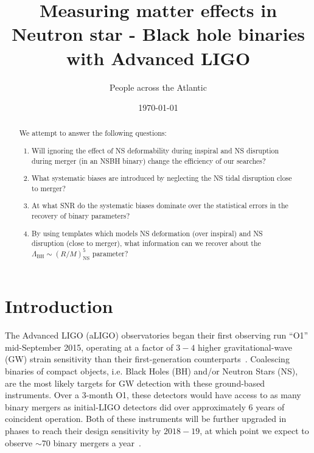 \documentclass[aps,prd,amsmath,floats,floatfix, twocolumn,
superscriptaddress,nofootinbib,showpacs]{revtex4-1}
\begin{document}
\title{
Measuring matter effects in Neutron star - Black hole binaries with Advanced LIGO
}

\author{People across the Atlantic}

\date{\today}

\begin{abstract}
We attempt to answer the following questions: 
\begin{enumerate}
 \item Will ignoring the effect of NS deformability during inspiral and NS 
 disruption during merger (in an NSBH binary) change the efficiency of our 
 searches?
 \item What systematic biases are introduced by neglecting the NS tidal
 disruption close to merger? 
 \item At what SNR do the systematic biases dominate over the statistical 
 errors in the recovery of binary parameters?
 \item By using templates which models NS deformation (over inspiral) and 
 NS disruption (close to merger), what information can we recover about
 the $\Lambda_\mathrm{BH}\sim (R/M)^5_\mathrm{NS}$ parameter?
\end{enumerate}
\end{abstract}

\pacs{}

\maketitle

\section{Introduction}

The Advanced LIGO (aLIGO) observatories began their first observing run ``O1''
mid-September 2015, operating at a factor of $3-4$ higher gravitational-wave (GW) 
strain sensitivity than their first-generation counterparts~\cite{Shoemaker2009}.
Coalescing binaries of
compact objects, i.e. Black Holes (BH) and/or Neutron Stars (NS), are the most
likely targets for GW detection with these ground-based instruments. Over a
$3$-month O1, these detectors would have access to as
many binary mergers as initial-LIGO detectors did over approximately $6$ years
of coincident operation. Both of these instruments will be further upgraded in
phases to reach their design sensitivity by $2018-19$, at which point we expect to
observe $\sim 70$ binary mergers a year~\cite{Abadie:2010cf}.
\end{document}
